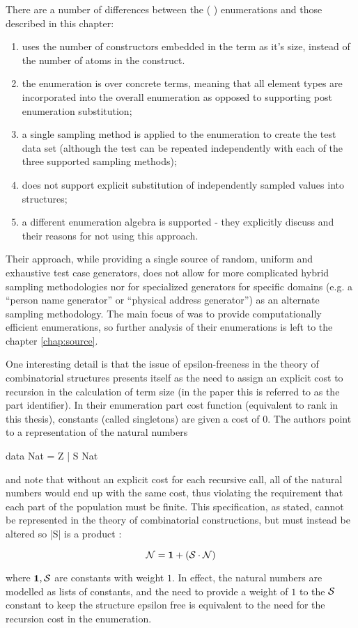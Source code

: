 
There are a number of differences between the \FEAT (\cite{Duregard2012} ) enumerations
and those described in this chapter:

\begin{enumerate}
\item \FEAT uses the number of constructors embedded in the term as it's size,
instead of the number of atoms in the construct.
\item the enumeration is over concrete terms, meaning that all element types are incorporated into the overall enumeration
as opposed to supporting post enumeration substitution;
\item  a single sampling method is applied to the enumeration to create the test data set
(although the test can be repeated independently with each of the three supported sampling methods);
\item \FEAT does not support explicit substitution of independently sampled values into structures;
\item a different enumeration algebra is supported - 
they explicitly discuss \cite{FlSa95} and their reasons for not using this approach.
\end{enumerate}

Their approach, while providing a single source of random, uniform and exhaustive test case generators,
does not allow for more complicated hybrid sampling methodologies
nor for specialized generators for specific domains (e.g. a ``person name generator'' or ``physical address generator'')
as an alternate sampling methodology.
The main focus of \FEAT was to provide computationally efficient enumerations,
so further analysis of their enumerations is left to the chapter \ref{chap:source}.

One interesting detail is that the issue of epsilon-freeness in the theory of combinatorial structures
presents itself as the need to assign an explicit cost to recursion in the calculation of term size
(in the paper this is referred to as the part identifier).
In their enumeration part cost function (equivalent to rank in this thesis),
constants (called singletons) are given a cost of $0$.
The authors point to a representation of the natural numbers

\begin{code}
data Nat = Z | S Nat
\end{code}

and note that without an explicit cost for each recursive call,
all of the natural numbers would end up with the same cost,
thus violating the requirement that each part of the population must be finite.
This specification, as stated, cannot be represented in the theory of combinatorial constructions,
but must instead be altered so |S| is a product :

$$ \mathcal{N} = \mathbf{1} + (\mathcal{S} \cdot \mathcal{N}) $$

where $\mathbf{1}, \mathcal{S}$ are constants with weight $1$.
In effect, the natural numbers are modelled as lists of constants,
and the need to provide a weight of $1$ to the $\mathcal{S}$ constant to keep the structure epsilon free
is equivalent to the need for the recursion cost in the \FEAT enumeration.


